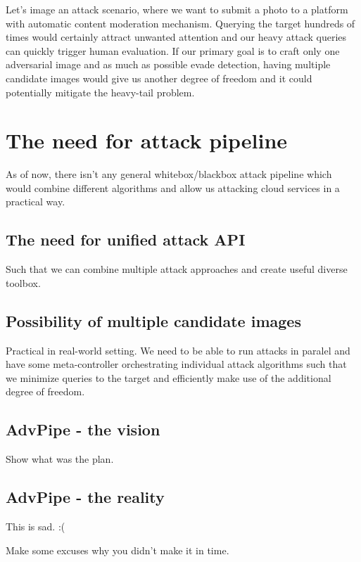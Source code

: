 Let's image an attack scenario, where we want to submit a photo to a platform with automatic content moderation mechanism. Querying the target hundreds of times would certainly attract unwanted attention and our heavy attack queries can quickly trigger human evaluation. If our primary goal is to craft only one adversarial image and as much as possible evade detection, having multiple candidate images would give us another degree of freedom and it could potentially mitigate the heavy-tail problem.

\section{The need for attack pipeline}
As of now, there isn't any general whitebox/blackbox attack pipeline which would combine different algorithms and allow us attacking cloud services in a practical way.

\subsection{The need for unified attack API}
Such that we can combine multiple attack approaches and create useful diverse toolbox.

\subsection{Possibility of multiple candidate images}
Practical in real-world setting. We need to be able to run attacks in paralel and have some meta-controller orchestrating individual attack algorithms such that we minimize queries to the target and efficiently make use of the additional degree of freedom.

\subsection{AdvPipe - the vision}
Show what was the plan.

\subsection{AdvPipe - the reality}
This is sad. :(

Make some excuses why you didn't make it in time.